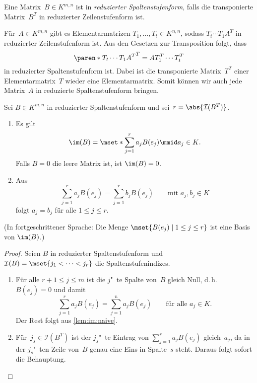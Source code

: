 \documentclass[a4paper]{article}
\begin{document}
\begin{definition}
    Eine Matrix~$B \in K^{m,n}$ ist in \emph{reduzierter Spaltenstufenform}, falls die transponierte Matrix~$B^T$ in reduzierter Zeilenstufenform ist.
\end{definition}

\begin{remark}
    Für~$A \in K^{m,n}$ gibt es Elementarmatrizen $T_1,\dots,T_t \in K^{n,n}$, sodass $T_t\cdots T_1A^T$ in reduzierter Zeilenstufenform ist. Aus den Gesetzen zur Transposition folgt, dass
    \begin{equation*}
        \paren*{T_t \cdots T_1 A^T}^T = A T_1^T \cdots T_t^T
    \end{equation*}
    in reduzierter Spaltenstufenform ist. Dabei ist die transponierte Matrix~$T^T$ einer Elementarmatrix~$T$ wieder eine Elementarmatrix. Somit können wir auch jede Matrix~$A$ in reduzierte Spaltenstufenform bringen.
\end{remark}

\begin{theorem}
    Sei $B \in K^{m,n}$ in reduzierter Spaltenstufenform und sei~$r = \abs{\mathcal{I}(B^T)}$.
    \begin{enumerate}
        \item Es gilt
              \begin{equation*}
                  \im(B) = \mset*{\sum_{j=1}^r a_jB(e_j) \mmid a_j \in K}.
              \end{equation*}
              Falls $B = 0$ die leere Matrix ist, ist $\im(B) = 0$.
        \item Aus
              \begin{equation*}
                  \sum_{j=1}^r a_jB(e_j) = \sum_{j=1}^r b_jB(e_j) \qquad\text{mit } a_j,b_j \in K
              \end{equation*}
              folgt $a_j = b_j$ für alle $1 \leq j \leq r$.
    \end{enumerate}
    (In fortgeschrittener Sprache: Die Menge $\mset{B(e_j) \mid 1 \leq j \leq r}$ ist eine Basis von $\im(B)$.)
\end{theorem}

\begin{proof}
    Seien $B$ in reduzierter Spaltenstufenform und $\mathcal{I}(B) = \mset{j_1 < \dots < j_r}$ die Spaltenstufenindizes.
    \begin{enumerate}
        \item Für alle $r+1 \leq j \leq m$ ist die $j$"~te Spalte von~$B$ gleich Null, d.\,h.\ $B(e_j) = 0$ und damit
              \begin{equation*}
                  \sum_{j=1}^r a_jB(e_j) = \sum_{j=1}^n a_jB(e_j) \qquad\text{für alle } a_j \in K.
              \end{equation*}
              Der Rest folgt aus \cref{lem:im:naive}.
        \item Für~$j_s \in \mathcal{I}(B^T)$ ist der $j_s$"~te Eintrag von $\sum_{j=1}^r a_jB(e_j)$ gleich~$a_j$, da in der $j_s$"~ten Zeile von~$B$ genau eine Eins in Spalte~$s$ steht. Daraus folgt sofort die Behauptung.\qedhere
    \end{enumerate}
\end{proof}
\end{document}
